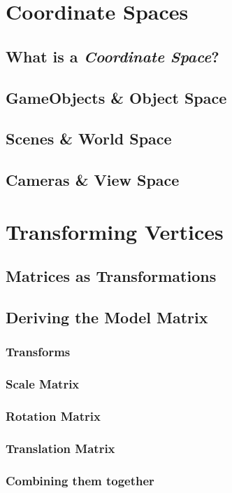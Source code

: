 \documentclass{article}
\begin{document}
\section{Coordinate Spaces}
\subsection{What is a \textit{Coordinate Space}?}
\subsection{GameObjects \& Object Space}
\subsection{Scenes \& World Space}
\subsection{Cameras \& View Space}

\section{Transforming Vertices}
\subsection{Matrices as Transformations}

\subsection{Deriving the Model Matrix}
\subsubsection{Transforms}
\subsubsection{Scale Matrix}
\subsubsection{Rotation Matrix}
\subsubsection{Translation Matrix}
\subsubsection{Combining them together}
\end{document}
